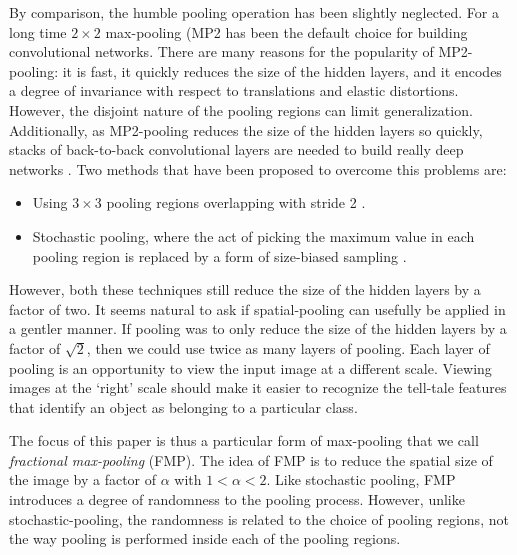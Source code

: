 \documentclass[english]{article}
\begin{document}
By comparison, the humble pooling operation has been slightly neglected.
For a long time $2\times2$ max-pooling (MP2 has been the default
choice for building convolutional networks. There are many reasons
for the popularity of MP2-pooling: it is fast, it quickly reduces
the size of the hidden layers, and it encodes a degree of invariance
with respect to translations and elastic distortions. However, the
disjoint nature of the pooling regions can limit generalization. Additionally,
as MP2-pooling reduces the size of the hidden layers so quickly, stacks
of back-to-back convolutional layers are needed to build really deep
networks \cite{NetworkInNetwork,VGG2014,GoogLeNet}. Two methods that
have been proposed to overcome this problems are:
\begin{itemize}
\item Using $3\times3$ pooling regions overlapping with stride 2 \cite{conf/nips/KrizhevskySH12}.
\item Stochastic pooling, where the act of picking the maximum value in
each pooling region is replaced by a form of size-biased sampling
\cite{StochasticPoolingZeilerFergus}.
\end{itemize}
However, both these techniques still reduce the size of the hidden
layers by a factor of two. It seems natural to ask if spatial-pooling
can usefully be applied in a gentler manner. If pooling was to only
reduce the size of the hidden layers by a factor of $\sqrt{2}$, then
we could use twice as many layers of pooling. Each layer of pooling
is an opportunity to view the input image at a different scale. Viewing
images at the `right' scale should make it easier to recognize
the tell-tale features that identify an object as belonging to a particular
class.

The focus of this paper is thus a particular form of max-pooling that
we call \emph{fractional max-pooling} (FMP). The idea of FMP is to
reduce the spatial size of the image by a factor of $\alpha$ with
$1<\alpha<2$. Like stochastic pooling, FMP introduces a degree of
randomness to the pooling process. However, unlike stochastic-pooling,
the randomness is related to the choice of pooling regions, not the
way pooling is performed inside each of the pooling regions.
\end{document}
